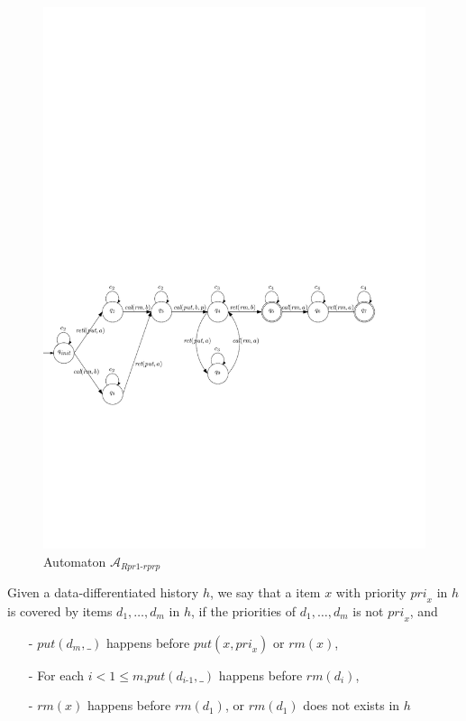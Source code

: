\documentclass{llncs}
\begin{document}
\begin{figure}[htbp]
  \centering
  \includegraphics[width=1 \textwidth]{PIC_AUTO_UNMATCHED_Rpr1-rprp.pdf}
  \caption{Automaton $\mathcal{A}_{\textit{Rpr1-rprp}}$}
  \label{fig:automata for Rpro-rprp}
\end{figure}



Given a data-differentiated history $h$, we say that a item $x$ with priority $\textit{pri}_x$ in $h$ is covered by items $d_1,\ldots,d_m$ in $h$, if the priorities of $d_1,\ldots,d_m$ is not $\textit{pri}_x$, and

\begin{itemize}
\setlength{\itemsep}{0.5pt}
\item[-] $\textit{put}(d_m,\_)$ happens before $\textit{put}(x,\textit{pri}_x)$ or $\textit{rm}(x)$,

\item[-] For each $i < 1 \leq m$,$\textit{put}(d_{\textit{i-1}},\_)$ happens before $\textit{rm}(d_i)$,

\item[-] $\textit{rm}(x)$ happens before $\textit{rm}(d_1)$, or $\textit{rm}(d_1)$ does not exists in $h$
\end{itemize}
\end{document}
